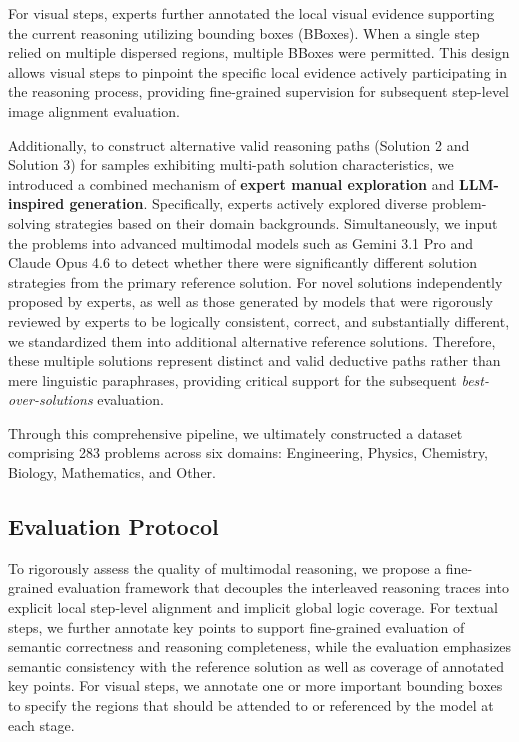 \documentclass[11pt]{article}
\begin{document}
For visual steps, experts further annotated the local visual evidence supporting the current reasoning utilizing bounding boxes (BBoxes). When a single step relied on multiple dispersed regions, multiple BBoxes were permitted. This design allows visual steps to pinpoint the specific local evidence actively participating in the reasoning process, providing fine-grained supervision for subsequent step-level image alignment evaluation.

Additionally, to construct alternative valid reasoning paths (Solution 2 and Solution 3) for samples exhibiting multi-path solution characteristics, we introduced a combined mechanism of \textbf{expert manual exploration} and \textbf{LLM-inspired generation}. Specifically, experts actively explored diverse problem-solving strategies based on their domain backgrounds. Simultaneously, we input the problems into advanced multimodal models such as Gemini 3.1 Pro and Claude Opus 4.6 to detect whether there were significantly different solution strategies from the primary reference solution. For novel solutions independently proposed by experts, as well as those generated by models that were rigorously reviewed by experts to be logically consistent, correct, and substantially different, we standardized them into additional alternative reference solutions. Therefore, these multiple solutions represent distinct and valid deductive paths rather than mere linguistic paraphrases, providing critical support for the subsequent \textit{best-over-solutions} evaluation.

Through this comprehensive pipeline, we ultimately constructed a dataset comprising 283 problems across six domains: Engineering, Physics, Chemistry, Biology, Mathematics, and Other.



\subsection{Evaluation Protocol}
\label{sec:eval_protocol}

To rigorously assess the quality of multimodal reasoning, we propose a fine-grained evaluation framework that decouples the interleaved reasoning traces into explicit local step-level alignment and implicit global logic coverage. For textual steps, we further annotate key points to support fine-grained evaluation of semantic correctness and reasoning completeness, while the evaluation emphasizes semantic consistency with the reference solution as well as coverage of annotated key points. For visual steps, we annotate one or more important bounding boxes to specify the regions that should be attended to or referenced by the model at each stage.
\end{document}
